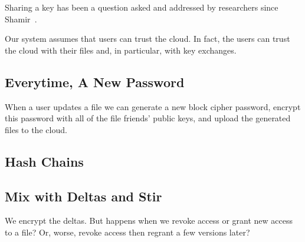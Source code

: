 Sharing a key has been a question asked and addressed by researchers
since Shamir~\cite{shamir}.

Our system assumes that users can trust the cloud. In fact, the users
can trust the cloud with their files and, in particular, with key
exchanges.

\subsection{Everytime, A New Password}

When a user updates a file we can generate a new block cipher
password, encrypt this password with all of the file friends' public
keys, and upload the generated files to the cloud.

\subsection{Hash Chains}


\subsection{Mix with Deltas and Stir}

We encrypt the deltas. But happens when we revoke access or grant new
access to a file? Or, worse, revoke access then regrant a few versions
later?